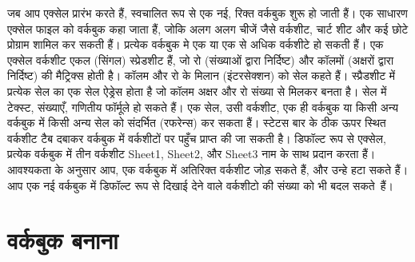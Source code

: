 जब आप एक्सेल प्रारंभ करते हैं, स्वचालित रूप से एक नई, रिक्त वर्कबुक शुरू हो जाती हैं। एक साधारण एक्सेल फाइल को वर्कबुक कहा जाता हैं, जोकि अलग अलग चीजें जैसे वर्कशीट, चार्ट शीट और कई छोटे प्रोग्राम शामिल कर सकती हैं। प्रत्येक वर्कबुक मे एक या एक से अधिक वर्कशीटे हो सकती हैं। एक एक्सेल वर्कशीट एकल (सिंगल) स्प्रेडशीट हैं, जो रो (संख्याओं द्वारा निर्दिष्ट) और कॉलमों (अक्षरों द्वारा निर्दिष्ट) की मैट्रिक्स होती है। कॉलम और रो के मिलान (इंटरसेक्शन) को सेल कहते हैं। स्प्रैडशीट में प्रत्येक सेल का एक सेल ऐड्रेस होता है जो कॉलम अक्षर और रो संख्या से मिलकर बनता है। सेल में टेक्स्ट, संख्याएँ, गणितीय फॉर्मूले हो सकते हैं। एक सेल, उसी वर्कशीट, एक ही वर्कबुक या किसी अन्य वर्कबुक में किसी अन्य सेल को संदर्भित (रफरेन्स) कर सकता हैं। स्टेटस बार के ठीक ऊपर स्थित वर्कशीट टैब दबाकर वर्कबुक में वर्कशीटों पर पहुँच प्राप्त की जा सकती है। डिफॉल्ट रूप से एक्सेल, प्रत्येक वर्कबुक में तीन वर्कशीट {\eng Sheet1, Sheet2,} और {\eng Sheet3} नाम के साथ प्रदान करता हैं। आवश्यकता के अनुसार आप, एक वर्कबुक में अतिरिक्त वर्कशीट जोड़ सकते हैं, और उन्हे हटा सकते हैं। आप एक नई वर्कबुक में डिफॉल्ट रूप से दिखाई देने वाले वर्कशीटो की संख्या को भी बदल सकते~हैं। 

\section{वर्कबुक बनाना}\label{id-1.3}

